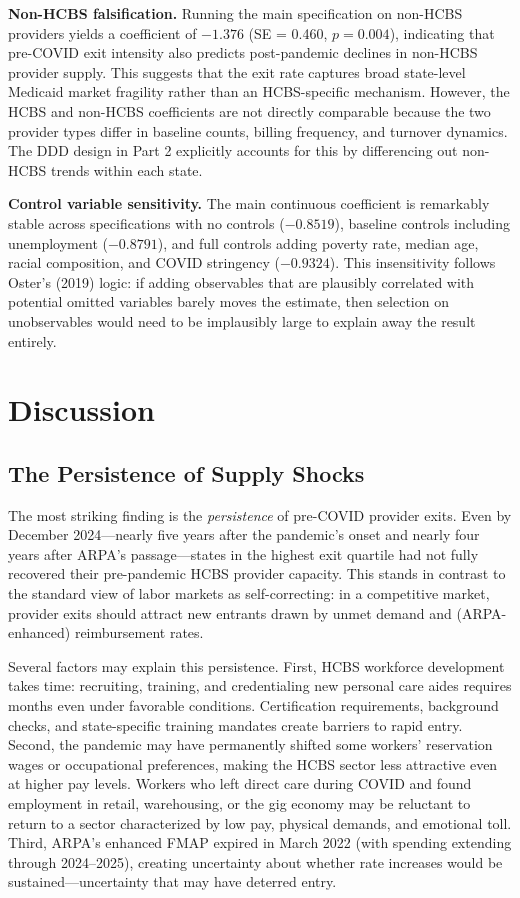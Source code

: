 \documentclass[12pt]{article}
\begin{document}
\textbf{Non-HCBS falsification.} Running the main specification on non-HCBS providers yields a coefficient of $-1.376$ (SE = 0.460, $p = 0.004$), indicating that pre-COVID exit intensity also predicts post-pandemic declines in non-HCBS provider supply. This suggests that the exit rate captures broad state-level Medicaid market fragility rather than an HCBS-specific mechanism. However, the HCBS and non-HCBS coefficients are not directly comparable because the two provider types differ in baseline counts, billing frequency, and turnover dynamics. The DDD design in Part 2 explicitly accounts for this by differencing out non-HCBS trends within each state.

\textbf{Control variable sensitivity.} The main continuous coefficient is remarkably stable across specifications with no controls ($-0.8519$), baseline controls including unemployment ($-0.8791$), and full controls adding poverty rate, median age, racial composition, and COVID stringency ($-0.9324$). This insensitivity follows Oster's (2019) logic: if adding observables that are plausibly correlated with potential omitted variables barely moves the estimate, then selection on unobservables would need to be implausibly large to explain away the result entirely.


\section{Discussion}

\subsection{The Persistence of Supply Shocks}

The most striking finding is the \emph{persistence} of pre-COVID provider exits. Even by December 2024---nearly five years after the pandemic's onset and nearly four years after ARPA's passage---states in the highest exit quartile had not fully recovered their pre-pandemic HCBS provider capacity. This stands in contrast to the standard view of labor markets as self-correcting: in a competitive market, provider exits should attract new entrants drawn by unmet demand and (ARPA-enhanced) reimbursement rates.

Several factors may explain this persistence. First, HCBS workforce development takes time: recruiting, training, and credentialing new personal care aides requires months even under favorable conditions. Certification requirements, background checks, and state-specific training mandates create barriers to rapid entry. Second, the pandemic may have permanently shifted some workers' reservation wages or occupational preferences, making the HCBS sector less attractive even at higher pay levels. Workers who left direct care during COVID and found employment in retail, warehousing, or the gig economy may be reluctant to return to a sector characterized by low pay, physical demands, and emotional toll. Third, ARPA's enhanced FMAP expired in March 2022 (with spending extending through 2024--2025), creating uncertainty about whether rate increases would be sustained---uncertainty that may have deterred entry.
\end{document}
